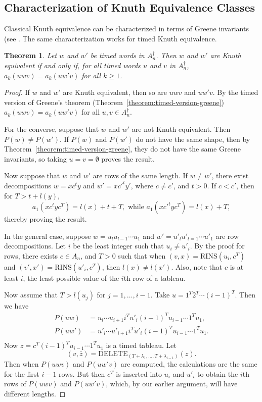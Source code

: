 \documentclass[10pt]{amsproc}
\newtheorem{theorem}{Theorem}[subsection]
\theoremstyle{definition}
\theoremstyle{remark}
\newcommand{\rowins}{\mathrm{RINS}}
\newcommand{\del}{\mathrm{DELETE}}
\begin{document}
\subsection{Characterization of Knuth Equivalence Classes}
\label{sec:char-timed-knuth}
Classical Knuth equivalence can be characterized in terms of Greene invariants (see \cite[Theorem~2.15]{plaxique}.
The same characterization works for timed Knuth equivalence.
\begin{theorem}
  Let $w$ and $w'$ be timed words in $A_n^\dagger$.
  Then $w$ and $w'$ are Knuth equivalent if and only if, for all timed words $u$ and $v$ in $A_n^\dagger$, $a_k(uwv)=a_k(uw'v)$ for all $k\geq 1$.
\end{theorem}
\begin{proof}
  If $w$ and $w'$ are Knuth equivalent, then so are $uwv$ and $uw'v$.
  By the timed version of Greene's theorem (Theorem~\ref{theorem:timed-version-greene}) $a_k(uwv)=a_k(uw'v)$ for all $u,v\in A_n^\dagger$.

  For the converse, suppose that $w$ and $w'$ are not Knuth equivalent.
  Then $P(w)\neq P(w')$.
  If $P(w)$ and $P(w')$ do not have the same shape, then by Theorem~\ref{theorem:timed-version-greene}, they do not have the same Greene invariants, so taking $u=v=\emptyset$ proves the result.

  Now suppose that $w$ and $w'$ are rows of the same length.
  If $w\neq w'$, there exist decompositions $w=xc^ty$ and $w'=x{c'}^ty'$, where $c\neq c'$, and $t>0$.
  If $c<c'$, then for $T>t+l(y)$,
  \begin{displaymath}
    a_1(xc^tyc^T) = l(x)+t+T, \text{ while } a_1(x{c'}^tyc^T) = l(x)+T,
  \end{displaymath}
  thereby proving the result.

  In the general case, suppose $w=u_lu_{l-1}\dotsb u_1$ and $w'=u'_lu'_{l=1}\dotsb u'_1$ are row decompositions.
  Let $i$ be the least integer such that $u_i\neq u'_i$.
  By the proof for rows, there exists $c\in A_n$, and $T>0$ such that when $(v,x)=\rowins(u_i,c^T)$ and $(v',x')=\rowins(u'_i,c^T)$, then $l(x)\neq l(x')$.
  Also, note that $c$ is at least $i$, the least possible value of the $i$th row of a tableau.

  Now assume that $T>l(u_j)$ for $j=1,\dotsc,i-1$.
  Take $u=1^T2^T\dotsb (i-1)^T$.
  Then we have
  \begin{align*}
    P(uw)&=u_l\dotsb u_{i+1} i^T u'_i (i-1)^T u_{i-1} \dotsb 1^T u_1,\\
    P(uw')&=u'_l\dotsb u'_{i+1} i^T u'_i (i-1)^T u_{i-1} \dotsb 1^T u_1.\\
  \end{align*}
  Now $z=c^T(i-1)^T u_{i-1} \dotsb 1^T u_1$ is a timed tableau.
  Let 
  \begin{displaymath}
    (v,\bar z)=\del_{(T+\lambda_1,\dotsc,T+\lambda_{i-1})}(z).
  \end{displaymath}
  Then when $P(uwv)$ and $P(uw'v)$ are computed, the calculations are the same for the first $i-1$ rows.
  But then $c^T$ is inserted into $u_i$ and $u'_i$ to obtain the $i$th rows of $P(uwv)$ and $P(uw'v)$, which, by our earlier argument, will have different lengths.
\end{proof}
\end{document}
